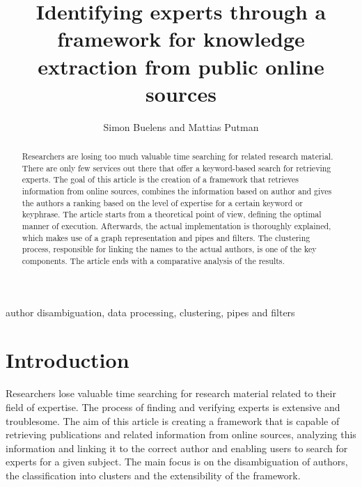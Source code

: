 \documentclass[9pt, twocolumn]{phdsymp} %
\begin{document}
\title{Identifying experts through a framework for knowledge extraction from public online sources} %

\author{Simon Buelens and Mattias Putman}


\maketitle

\begin{abstract} 

Researchers are losing too much valuable time searching for related research material. There are only few services out there that offer a keyword-based search for retrieving experts. The goal of this article is the creation of a framework that retrieves information from online sources, combines the information based on author and gives the authors a ranking based on the level of expertise for a certain keyword or keyphrase. The article starts from a theoretical point of view, defining the optimal manner of execution. Afterwards, the actual implementation is thoroughly explained, which makes use of a graph representation and pipes and filters. The clustering process, responsible for linking the names to the actual authors, is one of the key components. The article ends with a comparative analysis of the results.

\end{abstract}

\begin{keywords}
author disambiguation, data processing, clustering, pipes and filters
\end{keywords}

\section{Introduction}

Researchers lose valuable time searching for research material related to their field of expertise. The process of finding and verifying experts is extensive and troublesome. The aim of this article is creating a framework that is capable of retrieving publications and related information from online sources, analyzing this information and linking it to the correct author and enabling users to search for experts for a given subject. The main focus is on the disambiguation of authors, the classification into clusters and the extensibility of the framework.
\end{document}
